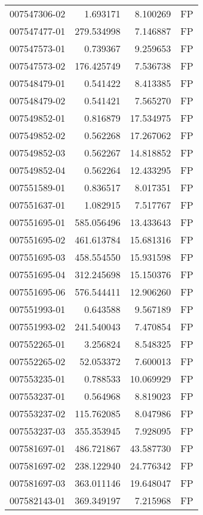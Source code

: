 \begin{tabular}{lrrl}
007547306-02 &    1.693171 &     8.100269 &   FP \\
007547477-01 &  279.534998 &     7.146887 &   FP \\
007547573-01 &    0.739367 &     9.259653 &   FP \\
007547573-02 &  176.425749 &     7.536738 &   FP \\
007548479-01 &    0.541422 &     8.413385 &   FP \\
007548479-02 &    0.541421 &     7.565270 &   FP \\
007549852-01 &    0.816879 &    17.534975 &   FP \\
007549852-02 &    0.562268 &    17.267062 &   FP \\
007549852-03 &    0.562267 &    14.818852 &   FP \\
007549852-04 &    0.562264 &    12.433295 &   FP \\
007551589-01 &    0.836517 &     8.017351 &   FP \\
007551637-01 &    1.082915 &     7.517767 &   FP \\
007551695-01 &  585.056496 &    13.433643 &   FP \\
007551695-02 &  461.613784 &    15.681316 &   FP \\
007551695-03 &  458.554550 &    15.931598 &   FP \\
007551695-04 &  312.245698 &    15.150376 &   FP \\
007551695-06 &  576.544411 &    12.906260 &   FP \\
007551993-01 &    0.643588 &     9.567189 &   FP \\
007551993-02 &  241.540043 &     7.470854 &   FP \\
007552265-01 &    3.256824 &     8.548325 &   FP \\
007552265-02 &   52.053372 &     7.600013 &   FP \\
007553235-01 &    0.788533 &    10.069929 &   FP \\
007553237-01 &    0.564968 &     8.819023 &   FP \\
007553237-02 &  115.762085 &     8.047986 &   FP \\
007553237-03 &  355.353945 &     7.928095 &   FP \\
007581697-01 &  486.721867 &    43.587730 &   FP \\
007581697-02 &  238.122940 &    24.776342 &   FP \\
007581697-03 &  363.011146 &    19.648047 &   FP \\
007582143-01 &  369.349197 &     7.215968 &   FP \\

\end{tabular}
